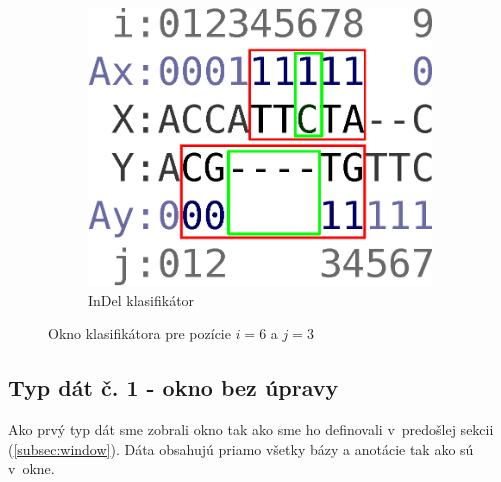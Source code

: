 \begin{figure}[h]
\begin{subfigure}[b]{0.35\textwidth}
                \includegraphics[width=\textwidth]{images/window_i}
                \caption{InDel klasifikátor}
                \label{fig:window-i}
        \end{subfigure}
        \caption[Okno klasifikátora]{Okno klasifikátora pre pozície $i = 6$ a $j = 3$}
\end{figure}


\subsection{Typ dát č. 1 - okno bez úpravy}
\label{subsec:datatype1}

Ako prvý typ dát sme zobrali okno tak ako sme ho definovali v~predošlej sekcii (\ref{subsec:window}). Dáta obsahujú priamo všetky bázy a anotácie tak ako sú v~okne.

